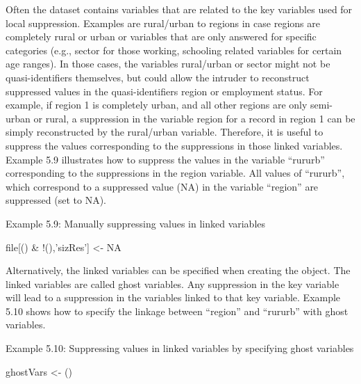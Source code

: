 \documentclass[letterpaper,10pt,english]{sphinxmanual}
\begin{document}
Often the dataset contains variables that are related to the key
variables used for local suppression. Examples are rural/urban to
regions in case regions are completely rural or urban or variables that
are only answered for specific categories (e.g., sector for those
working, schooling related variables for certain age ranges). In those
cases, the variables rural/urban or sector might not be
quasi-identifiers themselves, but could allow the intruder to
reconstruct suppressed values in the quasi-identifiers region or
employment status. For example, if region 1 is completely urban, and all
other regions are only semi-urban or rural, a suppression in the
variable region for a record in region 1 can be simply reconstructed by
the rural/urban variable. Therefore, it is useful to suppress the values
corresponding to the suppressions in those linked variables. Example 5.9
illustrates how to suppress the values in the variable “rururb”
corresponding to the suppressions in the region variable. All values of
“rururb”, which correspond to a suppressed value (NA) in the variable
“region” are suppressed (set to NA).

Example 5.9: Manually suppressing values in linked variables

\begin{DUlineblock}{0em}
\item[] 
\item[] file{[}() \&
!(),’sizRes’{]} \textless{}- NA
\end{DUlineblock}

Alternatively, the linked variables can be specified when creating the
 object. The linked variables are called ghost variables. Any
suppression in the key variable will lead to a suppression in the
variables linked to that key variable. Example 5.10 shows how to specify
the linkage between “region” and “rururb” with ghost variables.

Example 5.10: Suppressing values in linked variables by specifying ghost
variables

\begin{DUlineblock}{0em}
\item[] 
\item[] ghostVars \textless{}- ()
\end{DUlineblock}
\end{document}
